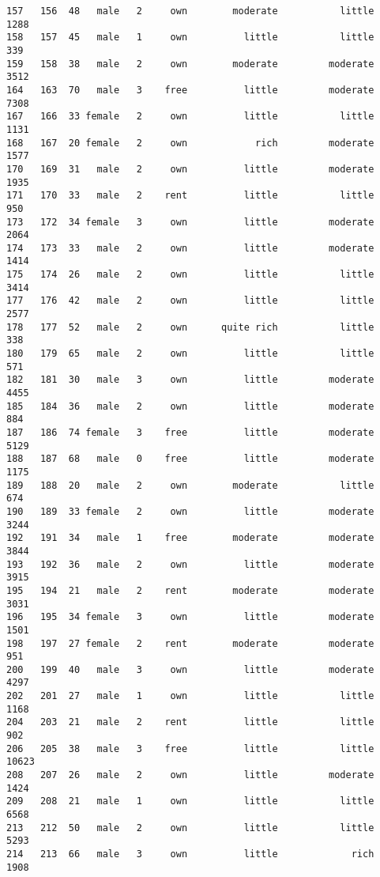 \documentclass[
]{article}
\begin{document}
\begin{verbatim}
157   156  48   male   2     own        moderate           little          1288
158   157  45   male   1     own          little           little           339
159   158  38   male   2     own        moderate         moderate          3512
164   163  70   male   3    free          little         moderate          7308
167   166  33 female   2     own          little           little          1131
168   167  20 female   2     own            rich         moderate          1577
170   169  31   male   2     own          little         moderate          1935
171   170  33   male   2    rent          little           little           950
173   172  34 female   3     own          little         moderate          2064
174   173  33   male   2     own          little         moderate          1414
175   174  26   male   2     own          little           little          3414
177   176  42   male   2     own          little           little          2577
178   177  52   male   2     own      quite rich           little           338
180   179  65   male   2     own          little           little           571
182   181  30   male   3     own          little         moderate          4455
185   184  36   male   2     own          little         moderate           884
187   186  74 female   3    free          little         moderate          5129
188   187  68   male   0    free          little         moderate          1175
189   188  20   male   2     own        moderate           little           674
190   189  33 female   2     own          little         moderate          3244
192   191  34   male   1    free        moderate         moderate          3844
193   192  36   male   2     own          little         moderate          3915
195   194  21   male   2    rent        moderate         moderate          3031
196   195  34 female   3     own          little         moderate          1501
198   197  27 female   2    rent        moderate         moderate           951
200   199  40   male   3     own          little         moderate          4297
202   201  27   male   1     own          little           little          1168
204   203  21   male   2    rent          little           little           902
206   205  38   male   3    free          little           little         10623
208   207  26   male   2     own          little         moderate          1424
209   208  21   male   1     own          little           little          6568
213   212  50   male   2     own          little           little          5293
214   213  66   male   3     own          little             rich          1908

\end{verbatim}
\end{document}
